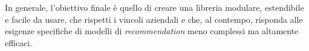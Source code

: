 In generale, l'obiettivo finale è quello di creare una libreria modulare, estendibile e facile da usare, che rispetti i vincoli aziendali e che, al contempo, risponda alle esigenze specifiche di modelli di \textit{recommendation} meno complessi ma altamente efficaci.



